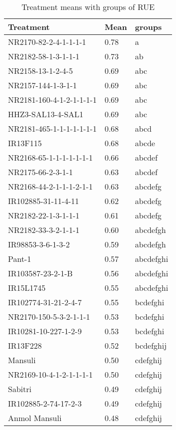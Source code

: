 \documentclass[]{article}
\begin{document}
\begin{longtable}{lll}
\caption{\label{tab:two-fac-groups-tab-agroclimate-normal}Treatment means with groups of RUE}\\
\toprule
Treatment & Mean & groups\\
\midrule
\rowcolor{gray!6}  NR2170-82-2-4-1-1-1-1 & 0.78 & a\\
NR2182-58-1-3-1-1-1 & 0.73 & ab\\
\rowcolor{gray!6}  NR2158-13-1-2-4-5 & 0.69 & abc\\
NR2157-144-1-3-1-1 & 0.69 & abc\\
\rowcolor{gray!6}  NR2181-160-4-1-2-1-1-1-1 & 0.69 & abc\\
\addlinespace
HHZ3-SAL13-4-SAL1 & 0.69 & abc\\
\rowcolor{gray!6}  NR2181-465-1-1-1-1-1-1-1 & 0.68 & abcd\\
IR13F115 & 0.68 & abcde\\
\rowcolor{gray!6}  NR2168-65-1-1-1-1-1-1-1 & 0.66 & abcdef\\
NR2175-66-2-3-1-1 & 0.63 & abcdef\\
\addlinespace
\rowcolor{gray!6}  NR2168-44-2-1-1-1-2-1-1 & 0.63 & abcdefg\\
IR102885-31-11-4-11 & 0.62 & abcdefg\\
\rowcolor{gray!6}  NR2182-22-1-3-1-1-1 & 0.61 & abcdefg\\
NR2182-33-3-2-1-1-1 & 0.60 & abcdefgh\\
\rowcolor{gray!6}  IR98853-3-6-1-3-2 & 0.59 & abcdefgh\\
\addlinespace
Pant-1 & 0.57 & abcdefghi\\
\rowcolor{gray!6}  IR103587-23-2-1-B & 0.56 & abcdefghi\\
IR15L1745 & 0.55 & abcdefghi\\
\rowcolor{gray!6}  IR102774-31-21-2-4-7 & 0.55 & bcdefghi\\
NR2170-150-5-3-2-1-1-1 & 0.53 & bcdefghi\\
\addlinespace
\rowcolor{gray!6}  IR10281-10-227-1-2-9 & 0.53 & bcdefghi\\
IR13F228 & 0.52 & bcdefghij\\
\rowcolor{gray!6}  Mansuli & 0.50 & cdefghij\\
NR2169-10-4-1-2-1-1-1-1 & 0.50 & cdefghij\\
\rowcolor{gray!6}  Sabitri & 0.49 & cdefghij\\
\addlinespace
IR102885-2-74-17-2-3 & 0.49 & cdefghij\\
\rowcolor{gray!6}  Anmol Mansuli & 0.48 & cdefghij\\

\end{longtable}
\end{document}
